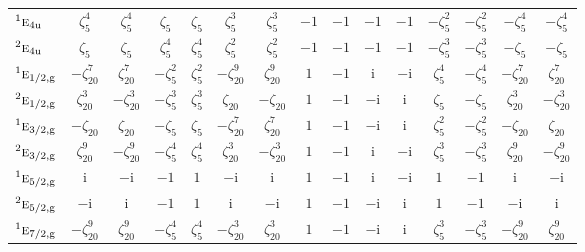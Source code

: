 \documentclass[10pt,a4paper]{article}
\makeatletter
\def\grouprule#1#2{\noalign{\marks\LTgroupmarks{\the\belowrulesep}\nobreak\vskip#1%
  \vskip\aboverulesep}\multispan\LT@cols\unskip{\leaders\hrule\@height#2\hfill\kern\z@}\cr
  \noalign{\penalty\LTrulebreak\vskip\belowrulesep\global\@lastruleclass\z@}}
\numberwithin{equation}{section}
\newcommand{\irr}[1]{\text{\normalfont\scshape #1}}
\newcommand{\conjpair}[1]{{}^{#1}}
\newcommand{\ptag}[1]{\mathrm{#1}}
\newcommand{\iunit}{\mathrm{i}}
\newcommand{\rootunity}[1]{\zeta_{#1}}
\makeatother
\begin{document}
{\begin{longtable}{@{}lcccccccccccccc@{}}
$\conjpair{1}\irr{e}_{4\ptag{u}}$ & $\rootunity{5}^{4}$ & $\rootunity{5}^{4}$ & $\rootunity{5}$ & $\rootunity{5}$ & $\rootunity{5}^{3}$ & $\rootunity{5}^{3}$ & $-1$ & $-1$ & $-1$ & $-1$ & $-\rootunity{5}^{2}$ & $-\rootunity{5}^{2}$ & $-\rootunity{5}^{4}$ & $-\rootunity{5}^{4}$\\
$\conjpair{2}\irr{e}_{4\ptag{u}}$ & $\rootunity{5}$ & $\rootunity{5}$ & $\rootunity{5}^{4}$ & $\rootunity{5}^{4}$ & $\rootunity{5}^{2}$ & $\rootunity{5}^{2}$ & $-1$ & $-1$ & $-1$ & $-1$ & $-\rootunity{5}^{3}$ & $-\rootunity{5}^{3}$ & $-\rootunity{5}$ & $-\rootunity{5}$\\
\grouprule{0pt}{\lightrulewidth}
$\conjpair{1}\irr{e}_{1/2,\ptag{g}}$ & $-\rootunity{20}^{7}$ & $\rootunity{20}^{7}$ & $-\rootunity{5}^{2}$ & $\rootunity{5}^{2}$ & $-\rootunity{20}^{9}$ & $\rootunity{20}^{9}$ & $1$ & $-1$ & $\iunit{}$ & $-\iunit{}$ & $\rootunity{5}^{4}$ & $-\rootunity{5}^{4}$ & $-\rootunity{20}^{7}$ & $\rootunity{20}^{7}$\\
$\conjpair{2}\irr{e}_{1/2,\ptag{g}}$ & $\rootunity{20}^{3}$ & $-\rootunity{20}^{3}$ & $-\rootunity{5}^{3}$ & $\rootunity{5}^{3}$ & $\rootunity{20}$ & $-\rootunity{20}$ & $1$ & $-1$ & $-\iunit{}$ & $\iunit{}$ & $\rootunity{5}$ & $-\rootunity{5}$ & $\rootunity{20}^{3}$ & $-\rootunity{20}^{3}$\\
$\conjpair{1}\irr{e}_{3/2,\ptag{g}}$ & $-\rootunity{20}$ & $\rootunity{20}$ & $-\rootunity{5}$ & $\rootunity{5}$ & $-\rootunity{20}^{7}$ & $\rootunity{20}^{7}$ & $1$ & $-1$ & $-\iunit{}$ & $\iunit{}$ & $\rootunity{5}^{2}$ & $-\rootunity{5}^{2}$ & $-\rootunity{20}$ & $\rootunity{20}$\\
$\conjpair{2}\irr{e}_{3/2,\ptag{g}}$ & $\rootunity{20}^{9}$ & $-\rootunity{20}^{9}$ & $-\rootunity{5}^{4}$ & $\rootunity{5}^{4}$ & $\rootunity{20}^{3}$ & $-\rootunity{20}^{3}$ & $1$ & $-1$ & $\iunit{}$ & $-\iunit{}$ & $\rootunity{5}^{3}$ & $-\rootunity{5}^{3}$ & $\rootunity{20}^{9}$ & $-\rootunity{20}^{9}$\\
$\conjpair{1}\irr{e}_{5/2,\ptag{g}}$ & $\iunit{}$ & $-\iunit{}$ & $-1$ & $1$ & $-\iunit{}$ & $\iunit{}$ & $1$ & $-1$ & $\iunit{}$ & $-\iunit{}$ & $1$ & $-1$ & $\iunit{}$ & $-\iunit{}$\\
$\conjpair{2}\irr{e}_{5/2,\ptag{g}}$ & $-\iunit{}$ & $\iunit{}$ & $-1$ & $1$ & $\iunit{}$ & $-\iunit{}$ & $1$ & $-1$ & $-\iunit{}$ & $\iunit{}$ & $1$ & $-1$ & $-\iunit{}$ & $\iunit{}$\\
$\conjpair{1}\irr{e}_{7/2,\ptag{g}}$ & $-\rootunity{20}^{9}$ & $\rootunity{20}^{9}$ & $-\rootunity{5}^{4}$ & $\rootunity{5}^{4}$ & $-\rootunity{20}^{3}$ & $\rootunity{20}^{3}$ & $1$ & $-1$ & $-\iunit{}$ & $\iunit{}$ & $\rootunity{5}^{3}$ & $-\rootunity{5}^{3}$ & $-\rootunity{20}^{9}$ & $\rootunity{20}^{9}$\\

\end{longtable}}
\end{document}

